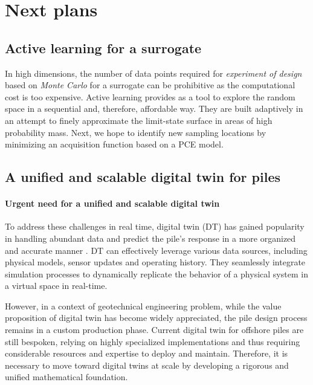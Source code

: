 \chapter{Next plans}

\label{Work_Plan}


\section{Active learning for a surrogate}
In high dimensions, the number of data points required for \textit{experiment of design} based on \textit{Monte Carlo} for a surrogate can be prohibitive as the computational cost is too expensive. Active learning provides as a tool to explore the random space in a sequential and, therefore, affordable way. They are built adaptively in an attempt to finely approximate the limit-state surface in areas of high probability mass. Next, we hope to identify new sampling locations by minimizing an acquisition function based on a \acrshort{PCE} model.





\section{A unified and scalable digital twin for piles}

\subsubsection{Urgent need for a unified and scalable digital twin}

To address these challenges in real time, digital twin (DT) has gained popularity in handling abundant data and predict the pile's response in a more organized and accurate manner \citep{wang2021}. DT can effectively leverage various data sources, including physical models, sensor updates and operating history. They seamlessly integrate simulation processes to dynamically replicate the behavior of a physical system in a virtual space in real-time. 


 However, in a context of geotechnical engineering problem, while the value proposition of digital twin has become widely appreciated, the pile design process remains in a custom production phase. Current digital twin for offshore piles are still bespoken, relying on highly specialized implementations and thus requiring considerable resources and expertise to deploy and maintain. Therefore, it is necessary to move toward digital twins at scale by developing a rigorous and unified mathematical foundation. 


